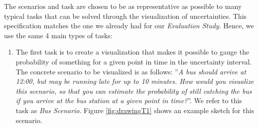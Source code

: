 The scenarios and task are chosen to be as representative as possible to many typical tasks that can be solved through the visualization of uncertainties. This specification matches the one we already had for our \textit{Evaluation Study}. Hence, we use the same 4 main types of tasks:
\begin{enumerate}
	\item The first task is to create a visualization that makes it possible to gauge the probability of something for a given point in time in the uncertainty interval. The concrete scenario to be visualized is as follows: ''\textit{A bus should arrive at 12:00, but may be running late for up to 10 minutes. How would you visualize this scenario, so that you can estimate the probability of still catching the bus if you arrive at the bus station at a given point in time?}''. We refer to this task as \textit{Bus Scenario}. Figure \ref{fig:drawingT1} shows an example sketch for this scenario.
	

\end{enumerate}
